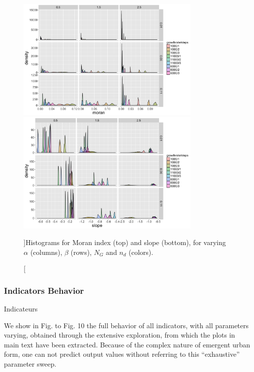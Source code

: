 \begin{figure}
\centering
\includegraphics[width=0.8\textwidth]{Figures/Density/hist_moran}\\
\includegraphics[width=0.8\textwidth]{Figures/Density/hist_slope}
\caption[][]{Histograms for Moran index (top) and slope (bottom), for varying $\alpha$ (columns), $\beta$ (rows), $N_G$ and $n_d$ (colors).}{}
\label{fig:histograms}
\end{figure}






\subsubsection{Indicators Behavior}{Indicateurs}


We show in Fig. to Fig. 10 the full behavior of all indicators, with all parameters varying, obtained through the extensive exploration, from which the plots in main text have been extracted. Because of the complex nature of emergent urban form, one can not predict output values without referring to this ``exhaustive'' parameter sweep.


